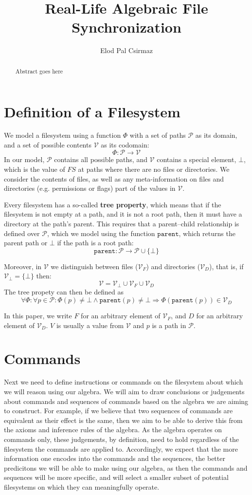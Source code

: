 \documentclass[12pt]{article}
\title{Real-Life Algebraic File Synchronization}
\author{Elod Pal Csirmaz}
\newcommand{\setv}{\mathcal{V}}
\newcommand{\setf}{\mathcal{V}_F}
\newcommand{\setd}{\mathcal{V}_D}
\newcommand{\setb}{\mathcal{V}_\empt}
\newcommand{\setp}{\mathcal{P}}
\newcommand{\empt}{\bot}
\newcommand{\parent}{\mathtt{parent}}
\newcommand{\FS}{\Phi} %
\begin{document}
\begin{abstract}
Abstract goes here
\end{abstract}

\section{Definition of a Filesystem}

We model a filesystem using a function $\FS$ with a set of paths $\setp$ as its domain,
and a set of possible contents $\setv$ as its codomain:
\[ \FS : \setp \rightarrow \setv \] 
In our model, $\setp$ contains all possible paths, and $\setv$ contains a special
element, $\empt$, which is the value of $FS$ at paths where there are no files
or directories.
We consider the contents of files, as well as any meta-information on files
and directories (e.g. permissions or flags) part of the values in $\setv$.

Every filesystem has a so-called \textbf{tree property}, which means that
if the filesystem is not empty at a path, and it is not a root path,
then it must have a directory at the path's parent.
This requires that a parent--child relationship is defined over $\setp$,
which we model using the function $\parent$, which returns the parent path
or $\empt$ if the path is a root path:
\[ \parent : \setp \rightarrow \setp \cup \{\empt\} \]

Moreover, in $\setv$ we distinguish between files ($\setf$) and directories ($\setd$), that is,
if $\setb = \{\empt\}$ then:
\[ \setv = \setb \cup \setf \cup \setd \]
The tree propety can then be defined as
\[ \forall \FS : \forall p\in\setp : \FS(p) \neq \empt \wedge \parent(p) \neq \empt \Rightarrow \FS(\parent(p)) \in \setd \]


In this paper, we write $F$ for an arbitrary element of $\setf$, and $D$ for an arbitrary element
of $\setd$. $V$ is usually a value from $\setv$ and $p$ is a path in $\setp$.

\section{Commands}

Next we need to define instructions or commands on the filesystem about which we will reason
using our algebra.
We will aim to draw conclusions or judgements about commands and sequences of commands
based on the algebra we are aiming to construct.
For example, if we believe that two sequences of commands are equivalent as their effect
is the same, then we aim to be able to derive this from the axioms and inference rules of the
algebra.
As the algebra operates on commands only,
these judgements, by definition, need to hold regardless of the filesystem the commands are applied to.
Accordingly, we expect that the more information one encodes into the commands and the sequences,
the better predicitons we will be able to make using our algebra,
as then the commands and sequences will be more specific, and will select a smaller subset
of potential filesystems on which they can meaningfully operate.
\end{document}
